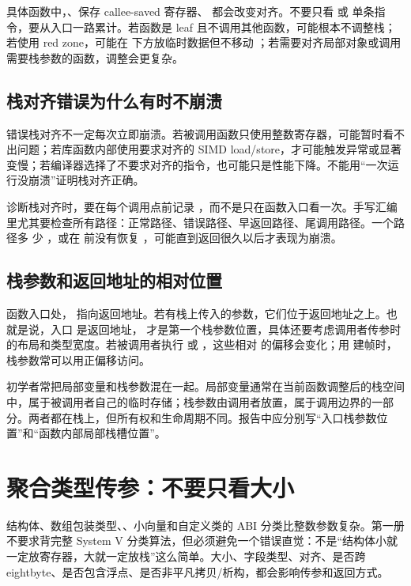 具体函数中，、保存 callee-saved 寄存器、 都会改变对齐。不要只看  或  单条指令，要从入口一路累计。若函数是 leaf 且不调用其他函数，可能根本不调整栈；若使用 red zone，可能在  下方放临时数据但不移动 ；若需要对齐局部对象或调用需要栈参数的函数，调整会更复杂。

\subsection{栈对齐错误为什么有时不崩溃}

错误栈对齐不一定每次立即崩溃。若被调用函数只使用整数寄存器，可能暂时看不出问题；若库函数内部使用要求对齐的 SIMD load/store，才可能触发异常或显著变慢；若编译器选择了不要求对齐的指令，也可能只是性能下降。不能用“一次运行没崩溃”证明栈对齐正确。

诊断栈对齐时，要在每个调用点前记录 ，而不是只在函数入口看一次。手写汇编里尤其要检查所有路径：正常路径、错误路径、早返回路径、尾调用路径。一个路径多  少 ，或在  前没有恢复 ，可能直到返回很久以后才表现为崩溃。

\subsection{栈参数和返回地址的相对位置}

函数入口处， 指向返回地址。若有栈上传入的参数，它们位于返回地址之上。也就是说，入口 \code{[rsp]} 是返回地址，\code{[rsp + 8]} 才是第一个栈参数位置，具体还要考虑调用者传参时的布局和类型宽度。若被调用者执行  或 ，这些相对  的偏移会变化；用  建帧时，栈参数常可以用正偏移访问。

初学者常把局部变量和栈参数混在一起。局部变量通常在当前函数调整后的栈空间中，属于被调用者自己的临时存储；栈参数由调用者放置，属于调用边界的一部分。两者都在栈上，但所有权和生命周期不同。报告中应分别写“入口栈参数位置”和“函数内部局部栈槽位置”。

\section{聚合类型传参：不要只看大小}

结构体、数组包装类型、、小向量和自定义类的 ABI 分类比整数参数复杂。第一册不要求背完整 System V 分类算法，但必须避免一个错误直觉：不是“结构体小就一定放寄存器，大就一定放栈”这么简单。大小、字段类型、对齐、是否跨 eightbyte、是否包含浮点、是否非平凡拷贝/析构，都会影响传参和返回方式。

